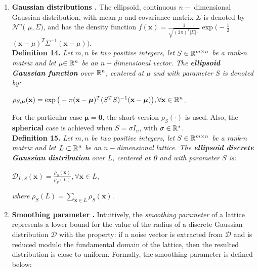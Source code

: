 \begin{enumerate}
	\item \textbf{Gaussian distributions \cite{AGH+12}.} The ellipsoid, continuous $n-$ dimensional Gaussian distribution, with mean {\boldmath$\mu$} and covariance matrix {\boldmath$\Sigma$} is denoted by $\mathcal{N}^n($ {\boldmath$\mu, \Sigma)$}, and has the density function $f(\textbf{x}) = \frac{1}{\sqrt{(2\pi)^k |\Sigma|\cdot}} \exp \big( -\frac{1}{2}$ {\boldmath$(\textbf{x} - \mu)^T \Sigma ^{-1} (\textbf{x} - \mu)$}$\big)$.\\
	
	\textbf{Definition 14.} \textit{ Let $m,n$ be two positive integers, let $S \in \mathbb{R}^{m\times n}$ be a rank-$n$ matrix and let {\boldmath$\mu$}$\in\mathbb{R}^n$ be an $n-$dimensional vector. The \textbf{ellipsoid Gaussian function} over $\mathbb{R}^n$, centered at {\boldmath$\mu$} and with parameter $S$ is denoted by:}
	\begin{center}
		$\rho_{S, \bm{\mu}}(\textbf{x}) = \exp \big(-\pi (\textbf{x} - \bm{\mu})^T(S^TS)^{-1}(\textbf{x} - \bm{\mu}) \big), \forall \textbf{x}\in \mathbb{R}^n$.
	\end{center}

	For the particular case $\bm{\mu} = \textbf{0}$, the short version $\rho_S(\cdot)$ is used. Also, the \textbf{spherical} case is achieved when $S = \sigma I_n$, with $\sigma \in \mathbb{R}^*$.\\
	
	\textbf{Definition 15.} \textit{Let $m,n$ be two positive integers, let $S \in \mathbb{R}^{m\times n}$ be a rank-$n$ matrix and let $L \subset \mathbb{R}^n$ be an $n-$dimensional lattice. The \textbf{ellipsoid discrete Gaussian distribution} over $L$, centered at \textbf{0} and with parameter $S$ is:} 
	\begin{center}
		$\mathcal{D}_{L,S}(\textbf{x}) = \frac{\rho_S(\textbf{x})}{\rho_S(L)}, \forall \textbf{x} \in L$,
	\end{center}
\textit{where} $\rho_S(L) = \displaystyle{\sum_{\textbf{x}\in L} \rho_S(\textbf{x})}$.
	
	\item \textbf{Smoothing parameter \cite{MiR04}.} Intuitively, the \textit{smoothing parameter} of a lattice represents a lower bound for the value of the radius of a discrete Gaussian distribution $\mathcal{D}$ with the property: if a noise vector is extracted from $\mathcal{D}$ and is reduced modulo the fundamental domain of the lattice, then the resulted distribution is close to uniform. Formally, the smoothing parameter is defined below:\\
	

\end{enumerate}
